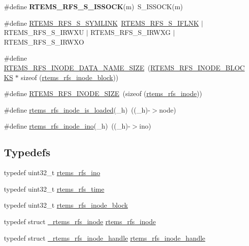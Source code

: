 \begin{DoxyCompactItemize}
\#define {\bfseries R\+T\+E\+M\+S\+\_\+\+R\+F\+S\+\_\+\+S\+\_\+\+I\+S\+S\+O\+CK}(m)~S\+\_\+\+I\+S\+S\+O\+CK(m)
\item 
\#define \mbox{\hyperlink{rtems-rfs-inode_8h_ae5e7ed2f716cbfe51395545c4dbf883f}{R\+T\+E\+M\+S\+\_\+\+R\+F\+S\+\_\+\+S\+\_\+\+S\+Y\+M\+L\+I\+NK}}~\mbox{\hyperlink{rtems-rfs-inode_8h_a081a7f768c9648fa065f3d5984003e1a}{R\+T\+E\+M\+S\+\_\+\+R\+F\+S\+\_\+\+S\+\_\+\+I\+F\+L\+NK}} $\vert$ R\+T\+E\+M\+S\+\_\+\+R\+F\+S\+\_\+\+S\+\_\+\+I\+R\+W\+XU $\vert$ R\+T\+E\+M\+S\+\_\+\+R\+F\+S\+\_\+\+S\+\_\+\+I\+R\+W\+XG $\vert$ R\+T\+E\+M\+S\+\_\+\+R\+F\+S\+\_\+\+S\+\_\+\+I\+R\+W\+XO
\item 
\#define \mbox{\hyperlink{rtems-rfs-inode_8h_aa50fd5fe0992936ddfae7aec4e2506f3}{R\+T\+E\+M\+S\+\_\+\+R\+F\+S\+\_\+\+I\+N\+O\+D\+E\+\_\+\+D\+A\+T\+A\+\_\+\+N\+A\+M\+E\+\_\+\+S\+I\+ZE}}~(\mbox{\hyperlink{rtems-rfs-file-system_8h_a89ff31e716c58b51c65d688662acb012}{R\+T\+E\+M\+S\+\_\+\+R\+F\+S\+\_\+\+I\+N\+O\+D\+E\+\_\+\+B\+L\+O\+C\+KS}} $\ast$ sizeof (\mbox{\hyperlink{rtems-rfs-inode_8h_aa30717f37e5238a8f6387b4d0dbb2ae3}{rtems\+\_\+rfs\+\_\+inode\+\_\+block}}))
\item 
\#define \mbox{\hyperlink{rtems-rfs-inode_8h_a273dbcf66c68c394ae21a06e0b4f2dac}{R\+T\+E\+M\+S\+\_\+\+R\+F\+S\+\_\+\+I\+N\+O\+D\+E\+\_\+\+S\+I\+ZE}}~(sizeof (\mbox{\hyperlink{rtems-rfs-inode_8h_a119b0085992c786d2f91b17a5ce11434}{rtems\+\_\+rfs\+\_\+inode}}))
\item 
\#define \mbox{\hyperlink{rtems-rfs-inode_8h_a0658d5a30e02b80c28465d8496d368af}{rtems\+\_\+rfs\+\_\+inode\+\_\+is\+\_\+loaded}}(\+\_\+h)~((\+\_\+h)-\/$>$node)
\item 
\#define \mbox{\hyperlink{rtems-rfs-inode_8h_aa74c46f4a0079f23ea2a0a9ffba075f6}{rtems\+\_\+rfs\+\_\+inode\+\_\+ino}}(\+\_\+h)~((\+\_\+h)-\/$>$ino)
\end{DoxyCompactItemize}
\subsection*{Typedefs}
\begin{DoxyCompactItemize}
\item 
typedef uint32\+\_\+t \mbox{\hyperlink{rtems-rfs-inode_8h_ae658325c3ff9941f2e68315d20e3c723}{rtems\+\_\+rfs\+\_\+ino}}
\item 
typedef uint32\+\_\+t \mbox{\hyperlink{rtems-rfs-inode_8h_a7877cc60240d76cccb89acaffdd20aa6}{rtems\+\_\+rfs\+\_\+time}}
\item 
typedef uint32\+\_\+t \mbox{\hyperlink{rtems-rfs-inode_8h_aa30717f37e5238a8f6387b4d0dbb2ae3}{rtems\+\_\+rfs\+\_\+inode\+\_\+block}}
\item 
typedef struct \mbox{\hyperlink{struct__rtems__rfs__inode}{\+\_\+rtems\+\_\+rfs\+\_\+inode}} \mbox{\hyperlink{rtems-rfs-inode_8h_a119b0085992c786d2f91b17a5ce11434}{rtems\+\_\+rfs\+\_\+inode}}
\item 
typedef struct \mbox{\hyperlink{struct__rtems__rfs__inode__handle}{\+\_\+rtems\+\_\+rfs\+\_\+inode\+\_\+handle}} \mbox{\hyperlink{rtems-rfs-inode_8h_a91f02dac5a2d91e072d676f3266ab8d2}{rtems\+\_\+rfs\+\_\+inode\+\_\+handle}}
\end{DoxyCompactItemize}

